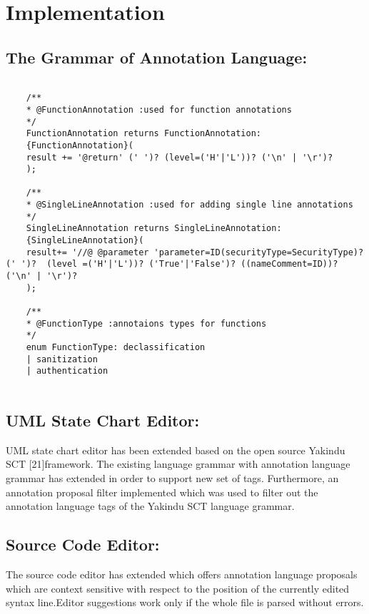 \chapter{Implementation}


\section{The Grammar of Annotation Language:}
\begin{lstlisting}
	
	/**
	* @FunctionAnnotation :used for function annotations
	*/ 
	FunctionAnnotation returns FunctionAnnotation:
	{FunctionAnnotation}( 
	result += '@return' (' ')? (level=('H'|'L'))? ('\n' | '\r')?
	);
	
	/**
	* @SingleLineAnnotation :used for adding single line annotations
	*/ 
	SingleLineAnnotation returns SingleLineAnnotation:
	{SingleLineAnnotation}(
	result+= '//@ @parameter 'parameter=ID(securityType=SecurityType)? (' ')?  (level =('H'|'L'))? ('True'|'False')? ((nameComment=ID))?  ('\n' | '\r')?	 
	);
		
	/**
	* @FunctionType :annotaions types for functions
	*/ 
	enum FunctionType: declassification 
	| sanitization
	| authentication
	
\end{lstlisting}

\section{UML State Chart Editor:}
UML state chart editor has been extended based on the open source Yakindu SCT [21]framework. The existing language grammar with
annotation language grammar has extended in order to support new set
of tags. Furthermore, an annotation proposal filter implemented which was used to filter out the annotation language tags of the Yakindu SCT language grammar.

\section{Source Code Editor:}
The source code editor has extended which offers annotation language proposals which are context sensitive with respect to the position of the currently edited syntax line.Editor suggestions work only if the whole file is parsed without errors.

